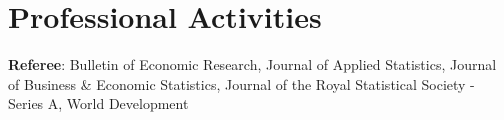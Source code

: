 \documentclass[12pt,letterpaper]{article}
\begin{document}
\section*{Professional Activities}
\textbf{Referee}: Bulletin of Economic Research, Journal of Applied Statistics, Journal of Business \& Economic Statistics, Journal of the Royal Statistical Society - Series A, World Development 

%
%
%





	
\end{document}
